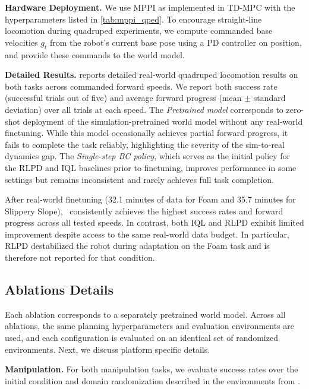 \textbf{Hardware Deployment.} We use MPPI as implemented in TD-MPC \cite{hansen2022temporal} with the hyperparameters listed in \cref{tab:mppi_qped}. To encourage straight-line locomotion during quadruped experiments, we compute commanded base velocities $g_t$ from the robot’s current base pose using a PD controller on position, and provide these commands to the world model.


\textbf{Detailed Results.}
 reports detailed real-world quadruped locomotion results on both tasks across commanded forward speeds. We report both success rate (successful trials out of five) and average forward progress (mean $\pm$ standard deviation) over all trials at each speed. The \emph{Pretrained model} corresponds to zero-shot deployment of the simulation-pretrained world model without any real-world finetuning. While this model occasionally achieves partial forward progress, it fails to complete the task reliably, highlighting the severity of the sim-to-real dynamics gap. The \emph{Single-step BC policy}, which serves as the initial policy for the RLPD and IQL baselines prior to finetuning, improves performance in some settings but remains inconsistent and rarely achieves full task completion.

After real-world finetuning (32.1 minutes of data for Foam and 35.7 minutes for Slippery Slope), \Method\ consistently achieves the highest success rates and forward progress across all tested speeds. In contrast, both IQL and RLPD exhibit limited improvement despite access to the same real-world data budget. In particular, RLPD destabilized the robot during adaptation on the Foam task and is therefore not reported for that condition.







\subsection{Ablations Details}
\label{app:ablations}
Each ablation corresponds to a separately pretrained world model. Across all ablations, the same planning hyperparameters and evaluation environments are used, and each configuration is evaluated on an identical set of randomized environments. Next, we discuss platform specific details.

\textbf{Manipulation.} For both manipulation tasks, we evaluate success rates over the initial condition and domain randomization described in the environments from \cite{yin2026emergent}. 


